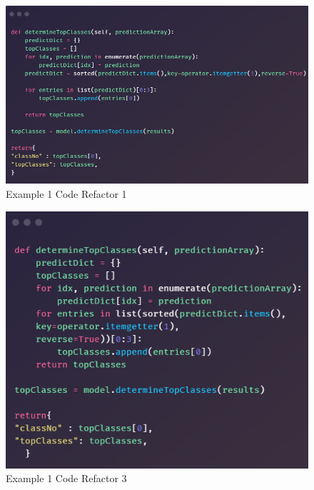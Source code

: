      \begin{figure}[H]
        \begin{center}
          \includegraphics[scale=0.5]{Images/Refactor/refactorA2}
          \caption{Example 1 Code Refactor 1}
          \label{fig:refactorA2}
        \end{center}
      \end{figure}

      \begin{figure}[H]
        \begin{center}
          \includegraphics[scale=0.5]{Images/Refactor/refactorA3}
          \caption{Example 1 Code Refactor 3}
          \label{fig:refactorA3}
        \end{center}
      \end{figure}


